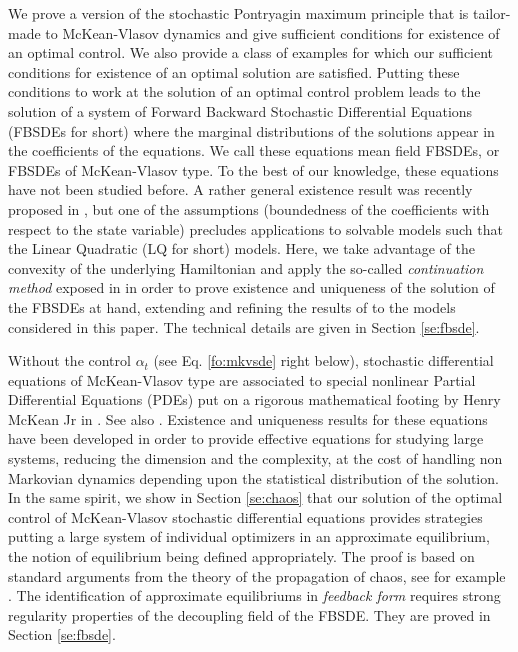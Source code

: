 \documentclass[11pt]{amsart}
\begin{document}
We prove a  version of the stochastic Pontryagin maximum principle that is tailor-made to McKean-Vlasov dynamics and give sufficient conditions for existence of an optimal
control. We also provide a class of examples for which our sufficient conditions for existence of an optimal solution are satisfied. Putting these conditions to work at the solution of an optimal control problem leads to the solution of a system of Forward Backward Stochastic Differential Equations (FBSDEs for short) where the marginal distributions of the solutions appear in the coefficients of the equations. We call these equations mean field FBSDEs, or FBSDEs of McKean-Vlasov type. To the best of our knowledge, these equations have not been studied before. A rather general existence result was recently proposed in \cite{CarmonaDelarue_ecp}, but one of the assumptions (boundedness of the coefficients with respect to the state variable) precludes applications to solvable models such that the Linear Quadratic (LQ for short) models. Here, we take advantage of the convexity of the underlying Hamiltonian 
and apply the so-called \emph{continuation method} exposed in \cite{PengWu}
in order to prove existence and uniqueness of the solution of the FBSDEs at hand, extending and refining the results of \cite{CarmonaDelarue_ecp} to the models considered in this paper.   The technical details are given in Section \ref{se:fbsde}.

Without the control $\alpha_t$ (see Eq. \eqref{fo:mkvsde} right below), stochastic differential equations of McKean-Vlasov type are associated to special nonlinear Partial Differential Equations (PDEs) put on a rigorous mathematical footing by Henry McKean Jr in \cite{McKean1}. See also \cite{McKean2,Sznitman,JourdainMeleardWoyczynski}. Existence and uniqueness results for these equations have been developed in order to provide effective equations for studying large systems, reducing the dimension and the complexity, at the cost of handling non Markovian dynamics depending upon the statistical distribution of the solution. In the same spirit, we show in Section   
\ref{se:chaos} that our solution of the optimal control of McKean-Vlasov stochastic differential equations provides strategies putting a large system of individual optimizers in an approximate equilibrium, the notion of equilibrium being defined appropriately. The proof is based on standard arguments from the theory of the propagation of chaos, see for example \cite{Sznitman,JourdainMeleardWoyczynski}. The identification of approximate equilibriums in \textit{feedback form}
 requires strong regularity properties of the decoupling field of the FBSDE. They are proved in Section \ref{se:fbsde}. 
\end{document}
